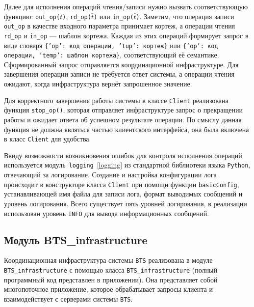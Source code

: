 Далее для исполнения операций чтения/записи нужно вызвать соответствующую функцию: \texttt{out_op($t$)}, \texttt{rd_op($\bar t$)} или \texttt{in_op($\bar t$)}. Заметим, что операция записи \texttt{out_op} в качестве входного параметра принимает кортеж, а операции чтения \texttt{rd_op} и \texttt{in_op} --- шаблон кортежа. Каждая из этих операций формирует запрос в виде словаря \texttt{\{'op': код операции, 'tup': кортеж\}} или \texttt{\{'op': код операции, 'temp': шаблон кортежа\}}, соответствующий её семантике. Сформированный запрос отправляется координационной инфраструктуре. Для завершения операции записи не требуется ответ системы, а операции чтения ожидают, когда инфраструктура вернёт запрошенное значение.

Для корректного завершения работы системы в классе \texttt{Client} реализована функция \texttt{stop_op()}, которая отправляет инфраструктуре запрос о прекращении работы и ожидает ответа об успешном результате операции. По смыслу данная функция не должна являться частью клиентского интерфейса, она была включена в класс \texttt{Client} для удобства.

Ввиду возможности возникновения ошибок для контроля исполнения операций используется модуль~\texttt{logging}~\ref{logging} из стандартной библиотеки языка \texttt{Python}, отвечающий за логирование. Создание и настройка конфигурации лога происходит в конструкторе класса \texttt{Client} при помощи функции \texttt{basicConfig}, устанавливающей имя файла для записи лога, формат выводимых сообщений и уровень логирования. Всего существует пять уровней логирования, в реализации использован уровень \texttt{INFO} для вывода информационных сообщений.

\subsection{Модуль BTS_infrastructure}\label{subsec:4}
Координационная инфраструктура системы \texttt{BTS} реализована в модуле \texttt{BTS_infrastructure} с помощью класса \texttt{BTS_infrastructure} (полный программный код представлен в приложении). Она представляет собой многопоточное приложение, которое обрабатывает запросы клиента и взаимодействует с серверами системы \texttt{BTS}.

